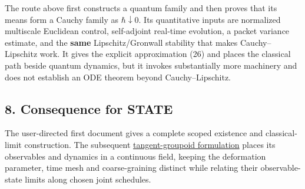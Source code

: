 \documentclass[11pt,a4paper]{article}
\begin{document}
The route above first constructs a quantum family and then proves that
its means form a Cauchy family as \(\hbar\downarrow0\). Its quantitative
inputs are normalized multiscale Euclidean control, self-adjoint
real-time evolution, a packet variance estimate, and the \textbf{same}
Lipschitz/Gronwall stability that makes Cauchy--Lipschitz work. It gives
the explicit approximation (26) and places the classical path beside
quantum dynamics, but it invokes substantially more machinery and does
not establish an ODE theorem beyond Cauchy--Lipschitz.

\hypertarget{consequence-for-state}{%
\subsection{8. Consequence for STATE}\label{consequence-for-state}}

The user-directed first document gives a complete scoped existence and
classical-limit construction. The subsequent
\href{groupoid-quantum-newton-states.md}{tangent-groupoid formulation}
places its observables and dynamics in a continuous field, keeping the
deformation parameter, time mesh and coarse-graining distinct while
relating their observable-state limits along chosen joint schedules.
\end{document}
